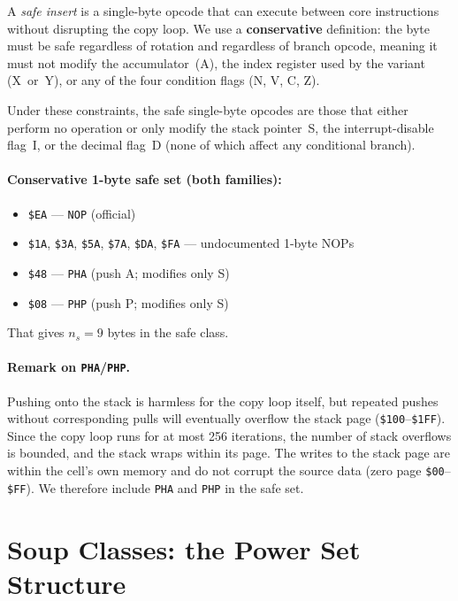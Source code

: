 \documentclass{article}
\newcommand{\hex}[1]{\texttt{\$#1}}
\newcommand{\opcode}[1]{\texttt{#1}}
\begin{document}
A \emph{safe insert} is a single-byte opcode that can execute between
core instructions without disrupting the copy loop.  We use a
\textbf{conservative} definition: the byte must be safe regardless of
rotation and regardless of branch opcode, meaning it must not modify
the accumulator~(A), the index register used by the variant (X~or~Y),
or any of the four condition flags (N, V, C, Z).

Under these constraints, the safe single-byte opcodes are those that
either perform no operation or only modify the stack pointer~S, the
interrupt-disable flag~I, or the decimal flag~D (none of which affect
any conditional branch).

\paragraph{Conservative 1-byte safe set (both families):}
\begin{itemize}
\item \hex{EA} --- \opcode{NOP} (official)
\item \hex{1A}, \hex{3A}, \hex{5A}, \hex{7A}, \hex{DA}, \hex{FA}
      --- undocumented 1-byte NOPs
\item \hex{48} --- \opcode{PHA} (push A; modifies only S)
\item \hex{08} --- \opcode{PHP} (push P; modifies only S)
\end{itemize}
That gives $n_s = 9$ bytes in the safe class.

\paragraph{Remark on \opcode{PHA}/\opcode{PHP}.}
Pushing onto the stack is harmless for the copy loop itself, but
repeated pushes without corresponding pulls will eventually overflow
the stack page (\hex{100}--\hex{1FF}).  Since the copy loop runs for
at most 256 iterations, the number of stack overflows is bounded, and
the stack wraps within its page.  The writes to the stack page are
within the cell's own memory and do not corrupt the source data
(zero page \hex{00}--\hex{FF}).  We therefore include \opcode{PHA}
and \opcode{PHP} in the safe set.

\section{Soup Classes: the Power Set Structure}
\label{sec:classes}
\end{document}
